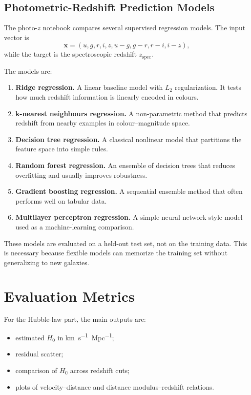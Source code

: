 \documentclass[11pt,a4paper]{article}
\begin{document}
\subsection{Photometric-Redshift Prediction Models}

The photo-$z$ notebook compares several supervised regression models. The input vector is
\begin{equation}
    \mathbf{x} = (u,g,r,i,z,u-g,g-r,r-i,i-z),
\end{equation}
while the target is the spectroscopic redshift $z_{\mathrm{spec}}$.

The models are:

\begin{enumerate}
    \item \textbf{Ridge regression.} A linear baseline model with $L_2$ regularization. It tests how much redshift information is linearly encoded in colours.
    \item \textbf{k-nearest neighbours regression.} A non-parametric method that predicts redshift from nearby examples in colour--magnitude space.
    \item \textbf{Decision tree regression.} A classical nonlinear model that partitions the feature space into simple rules.
    \item \textbf{Random forest regression.} An ensemble of decision trees that reduces overfitting and usually improves robustness.
    \item \textbf{Gradient boosting regression.} A sequential ensemble method that often performs well on tabular data.
    \item \textbf{Multilayer perceptron regression.} A simple neural-network-style model used as a machine-learning comparison.
\end{enumerate}

These models are evaluated on a held-out test set, not on the training data. This is necessary because flexible models can memorize the training set without generalizing to new galaxies.

\section{Evaluation Metrics}

For the Hubble-law part, the main outputs are:
\begin{itemize}
    \item estimated $H_0$ in \si{km.s^{-1}.Mpc^{-1}};
    \item residual scatter;
    \item comparison of $H_0$ across redshift cuts;
    \item plots of velocity--distance and distance modulus--redshift relations.
\end{itemize}
\end{document}
